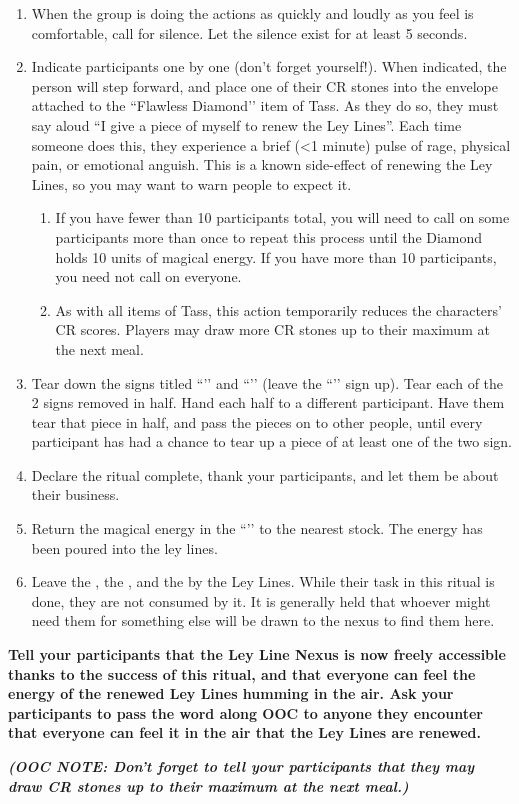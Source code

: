 \documentclass[green]{GL2020}
\begin{document}
\begin{enumerate}
  \item When the group is doing the actions as quickly and loudly as you feel is comfortable, call for silence. Let the silence exist for at least 5 seconds.
  \item Indicate participants one by one (don’t forget yourself!). When indicated, the person will step forward, and place one of their CR stones into the envelope attached to the ``Flawless Diamond’’ item of Tass. As they do so, they must say aloud “I give a piece of myself to renew the Ley Lines”. Each time someone does this, they experience a brief (<1 minute) pulse of rage, physical pain, or emotional anguish. This is a known side-effect of renewing the Ley Lines, so you may want to warn people to expect it.
    \begin{enumerate}
    \item If you have fewer than 10 participants total, you will need to call on some participants more than once to repeat this process until the Diamond holds 10 units of magical energy. If you have more than 10 participants, you need not call on everyone.
    \item As with all items of Tass, this action temporarily reduces the characters’ CR scores. Players may draw more CR stones up to their maximum at the next meal.
  \end{enumerate}  
  \item Tear down the signs titled ``\sLeyLinesNexus{}’’ and ``\sLeyLinesSad{}’’ (leave the ``\sLeyLinesHappy{}’’ sign up). Tear each of the 2 signs removed in half. Hand each half to a different participant. Have them tear that piece in half, and pass the pieces on to other people, until every participant has had a chance to tear up a piece of at least one of the two sign.
  \item Declare the ritual complete, thank your participants, and let them be about their business.
  \item Return the magical energy in the ``\iDiamond{}’’ to the nearest stock. The energy has been poured into the ley lines. 
  \item Leave the \iClay{}, the \iObsidian{}, and the \iLimestone{} by the Ley Lines. While their task in this ritual is done, they are not consumed by it. It is generally held that whoever might need them for something else will be drawn to the nexus to find them here.
\end{enumerate}

\textbf{Tell your participants that the Ley Line Nexus is now freely accessible thanks to the success of this ritual, and that everyone can feel the energy of the renewed Ley Lines humming in the air. Ask your participants to pass the word along OOC to anyone they encounter that everyone can feel it in the air that the Ley Lines are renewed.}

\emph{\textbf{(OOC NOTE: Don’t forget to tell your participants that they may draw CR stones up to their maximum at the next meal.)}}
\end{document}
